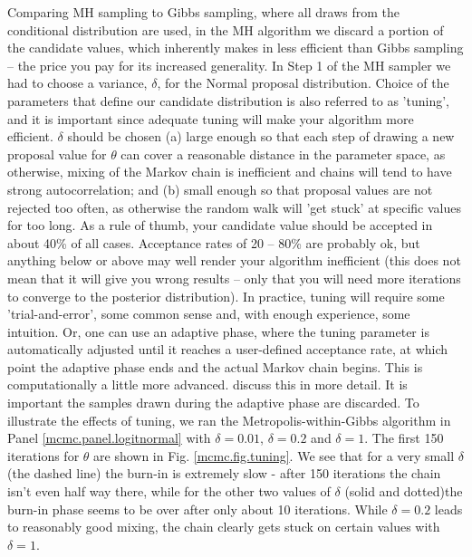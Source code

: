 Comparing MH sampling to Gibbs sampling, where all draws from the
conditional distribution are used, in the MH algorithm we discard a
portion of the candidate values, which inherently makes in less
efficient than Gibbs sampling – the price you pay for its increased
generality.  In Step 1 of the MH sampler we had to choose a variance,
$\delta$, for the Normal proposal distribution. Choice of the
parameters that define our candidate distribution is also referred to
as 'tuning', and it is important since adequate tuning will make your
algorithm more efficient.  $\delta$ should be chosen (a) large enough
so that each step of drawing a new proposal value for $\theta$ can
cover a reasonable distance in the parameter space, as otherwise,
mixing of the Markov chain is inefficient and chains will tend to have
strong autocorrelation; and (b) small enough so that proposal values
are not rejected too often, as otherwise the random walk will 'get
stuck' at specific values for too long.  As a rule of thumb, your
candidate value should be accepted in about 40\% of all
cases. Acceptance rates of 20 -- 80\% are probably ok, but anything
below or above may well render your algorithm inefficient (this does
not mean that it will give you wrong results – only that you will need
more iterations to converge to the posterior distribution). In
practice, tuning will require some 'trial-and-error', some common
sense and, with enough experience, some intuition. Or, one can use an adaptive phase, where the tuning parameter
is automatically adjusted until it reaches a user-defined acceptance
rate, at which point the adaptive phase ends and the actual Markov
chain begins. This is computationally a little more
advanced. \citet{link_barker:2009} discuss this in more detail. It is
important the samples drawn during the adaptive phase are discarded.
To illustrate the effects of tuning, we ran the
Metropolis-within-Gibbs algorithm in Panel \ref{mcmc.panel.logitnormal} with $\delta=0.01$,
$\delta=0.2$ and $\delta=1$. The first 150 iterations for $\theta$ are
shown in Fig. \ref{mcmc.fig.tuning}. We see that for a very small
$\delta$ (the dashed line) the burn-in is extremely slow - after 150
iterations the chain isn't even half way there, while for the other
two values of $\delta$ (solid and dotted)the burn-in phase seems to be
over after only about 10 iterations. While $\delta=0.2$ leads to
reasonably good mixing, the chain clearly gets stuck on certain values
with $\delta=1$.
